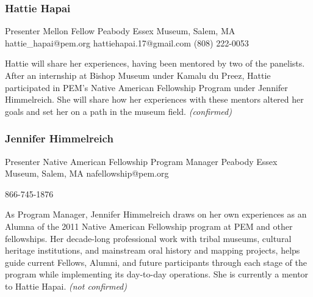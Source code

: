 \documentclass{report}
\begin{document}
              
                \subsubsection*{ Hattie Hapai }
                Presenter\newline
                Mellon Fellow\newline
                Peabody Essex Museum, Salem, MA
                \newline
                hattie_hapai@pem.org\newline
                hattiehapai.17@gmail.com\newline
                (808) 222-0053\newline

                Hattie will share her experiences, having been mentored by two of the panelists. After an internship at Bishop Museum under Kamalu du Preez, Hattie participated in PEM's Native American Fellowship Program under Jennifer Himmelreich. She will share how her experiences with these mentors altered her goals and set her on a path in the museum field.
                \emph{ (confirmed) }
              

              
                \subsubsection*{ Jennifer  Himmelreich }
                Presenter\newline
                Native American Fellowship Program Manager\newline
                Peabody Essex Museum, Salem, MA
                \newline
                nafellowship@pem.org\newline
                
                866-745-1876\newline

                As Program Manager, Jennifer Himmelreich draws on her own experiences as an Alumna of the 2011 Native American Fellowship program at PEM and other fellowships. Her decade-long professional work with tribal museums, cultural heritage institutions, and mainstream oral history and mapping projects, helps guide current Fellows, Alumni, and future participants through each stage of the program while implementing its day-to-day operations. She is currently a mentor to Hattie Hapai.
                \emph{ (not confirmed) }
              
\end{document}
